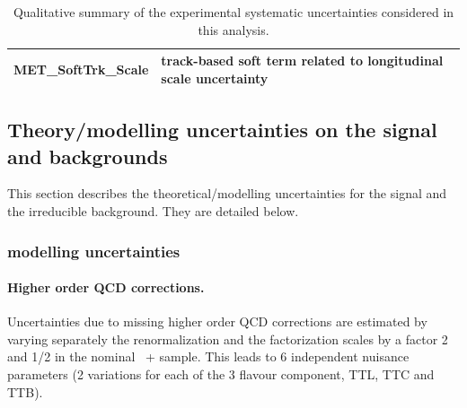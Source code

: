 \begin{table}[h]
\begin{center}
\begin{tabular}{ll}
                         MET\_SoftTrk\_Scale                  & track-based soft term related to longitudinal scale uncertainty                          \\ 
                         \bottomrule
                         \end{tabular}
    \end{center}
  \caption{ Qualitative summary of the experimental systematic uncertainties considered in this analysis.}
  \label{tab:syst_summary_sources}
\end{table}


\subsection{Theory/modelling uncertainties on the signal and backgrounds}

%
%

This section describes the theoretical/modelling uncertainties for the signal and the irreducible background. They are detailed below.  

\subsubsection{\ttbar modelling uncertainties}

\paragraph{Higher order QCD corrections.} Uncertainties due to missing higher order QCD corrections are estimated by varying separately the renormalization and the factorization scales by a factor 2 and 1/2 in the nominal \powhegs\ + \pythiaeight sample. This leads to 6 independent nuisance parameters (2 variations for each of the 3 flavour component, TTL, TTC and TTB).

